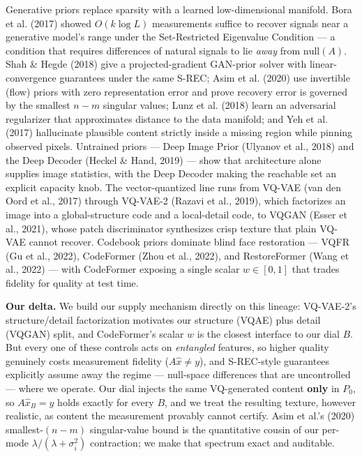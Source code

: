 \documentclass[11pt]{article}
\begin{document}
Generative priors replace sparsity with a learned low-dimensional manifold. Bora et al. (2017) showed $O(k \log L)$ measurements suffice to recover signals near a generative model's range under the Set-Restricted Eigenvalue Condition --- a condition that requires differences of natural signals to lie \textit{away} from $\mathrm{null}(A)$. Shah \& Hegde (2018) give a projected-gradient GAN-prior solver with linear-convergence guarantees under the same S-REC; Asim et al. (2020) use invertible (flow) priors with zero representation error and prove recovery error is governed by the smallest $n-m$ singular values; Lunz et al. (2018) learn an adversarial regularizer that approximates distance to the data manifold; and Yeh et al. (2017) hallucinate plausible content strictly inside a missing region while pinning observed pixels. Untrained priors --- Deep Image Prior (Ulyanov et al., 2018) and the Deep Decoder (Heckel \& Hand, 2019) --- show that architecture alone supplies image statistics, with the Deep Decoder making the reachable set an explicit capacity knob. The vector-quantized line runs from VQ-VAE (van den Oord et al., 2017) through VQ-VAE-2 (Razavi et al., 2019), which factorizes an image into a global-structure code and a local-detail code, to VQGAN (Esser et al., 2021), whose patch discriminator synthesizes crisp texture that plain VQ-VAE cannot recover. Codebook priors dominate blind face restoration --- VQFR (Gu et al., 2022), CodeFormer (Zhou et al., 2022), and RestoreFormer (Wang et al., 2022) --- with CodeFormer exposing a single scalar $w \in [0,1]$ that trades fidelity for quality at test time.

\textbf{Our delta.} We build our supply mechanism directly on this lineage: VQ-VAE-2's structure/detail factorization motivates our structure (VQAE) plus detail (VQGAN) split, and CodeFormer's scalar $w$ is the closest interface to our dial $B$. But every one of these controls acts on \textit{entangled} features, so higher quality genuinely costs measurement fidelity ($A\hat{x} \neq y$), and S-REC-style guarantees explicitly assume away the regime --- null-space differences that are uncontrolled --- where we operate. Our dial injects the same VQ-generated content \textbf{only} in $P_0$, so $A\hat{x}_B = y$ holds exactly for every $B$, and we treat the resulting texture, however realistic, as content the measurement provably cannot certify. Asim et al.'s (2020) smallest-$(n-m)$ singular-value bound is the quantitative cousin of our per-mode $\lambda/(\lambda+\sigma_i^2)$ contraction; we make that spectrum exact and auditable.
\end{document}
